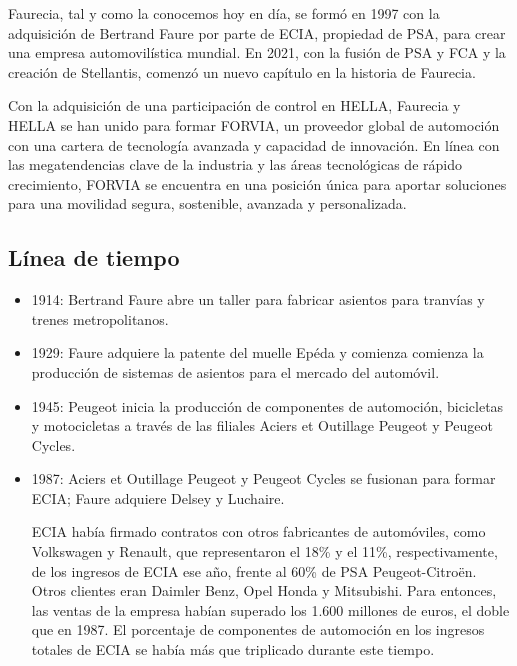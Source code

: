 \documentclass[letterpaper,12pt]{article}
\begin{document}
\begin{sloppypar}
Faurecia, tal y como la conocemos hoy en día, se formó en 1997 con la adquisición de Bertrand Faure por parte de ECIA, propiedad de PSA, para crear una empresa automovilística mundial. En 2021, con la fusión de PSA y FCA y la creación de Stellantis, comenzó un nuevo capítulo en la historia de Faurecia.

Con la adquisición de una participación de control en HELLA, Faurecia y HELLA se han unido para formar FORVIA, un proveedor global de automoción con una cartera de tecnología avanzada y capacidad de innovación. En línea con las megatendencias clave de la industria y las áreas tecnológicas de rápido crecimiento, FORVIA se encuentra en una posición única para aportar soluciones para una movilidad segura, sostenible, avanzada y personalizada.

\subsection*{Línea de tiempo}
\begin{itemize} %
    \item 1914: Bertrand Faure abre un taller para fabricar asientos para tranvías y trenes metropolitanos.
    \item 1929: Faure adquiere la patente del muelle Epéda y comienza comienza la producción de sistemas de asientos para el mercado del automóvil.
    \item 1945: Peugeot inicia la producción de componentes de automoción, bicicletas y motocicletas a través de las filiales Aciers et Outillage Peugeot y Peugeot Cycles.
    \item 1987:  Aciers et Outillage Peugeot y Peugeot Cycles se fusionan para formar ECIA; Faure adquiere Delsey y Luchaire.
    
    ECIA había firmado contratos con otros fabricantes de automóviles, como Volkswagen y Renault, que representaron el 18\% y el 11\%, respectivamente, de los ingresos de ECIA ese año, frente al 60\% de PSA Peugeot-Citroën. Otros clientes eran Daimler Benz, Opel Honda y Mitsubishi. Para entonces, las ventas de la empresa habían superado los 1.600 millones de euros, el doble que en 1987. El porcentaje de componentes de automoción en los ingresos totales de ECIA se había más que triplicado durante este tiempo.
    

\end{itemize}
\end{sloppypar}
\end{document}
